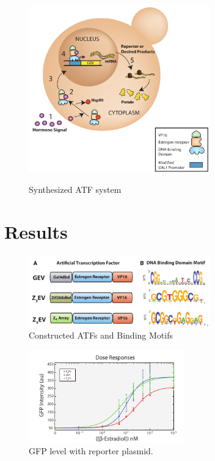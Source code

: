 \documentclass{beamer}
\begin{document}
\begin{frame}
    \begin{figure}[!ht]
        \begin{center}
        {\includegraphics[width=0.7\textwidth]{McIsaacfig1.png}}
        \caption{Synthesized ATF system}
        \label{fig:Curve1}
    \end{center}
\end{figure}
\end{frame}

\section{Results}
\begin{frame}
    \begin{figure}[!ht]
        \centering
        \includegraphics[width=0.7\textwidth]{McIsaacfig2.png}
        \caption{Constructed ATFs and Binding Motifs}
        \label{fig:atfs}
    \end{figure}
    \pause
    \begin{figure}[ht!]
        \centering
        \includegraphics[width=0.6\textwidth]{McIsaacfig3.png}
        \caption{GFP level with reporter plasmid.}
        \label{fig:grade}
    \end{figure}
\end{frame}
\end{document}
